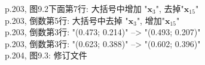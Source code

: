 \documentclass[UTF8]{article}
\begin{document}
p.203, 图9.2下面第7行: 大括号中增加 "$\bm{x}_3$", 去掉"$\bm{x}_{15}$" \\
p.203, 倒数第5行: 大括号中去掉 "$\bm{x}_3$", 增加"$\bm{x}_{15}$" \\
p.203, 倒数第3行: "(0.473; 0.214)" --> "(0.493; 0.207)" \\
p.203, 倒数第3行: "(0.623; 0.388)" --> "(0.602; 0.396)" \\
p.204, 图9.3: 修订文件     \\
\begin{figure}
	\centering
\end{figure}
\begin{figure}
	\centering
\end{figure}\\
\end{document}
